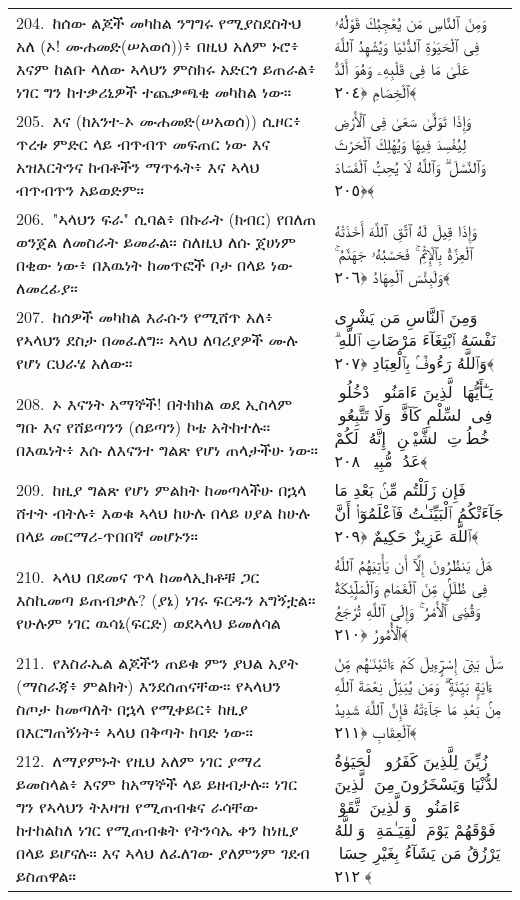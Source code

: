 \documentclass[11pt,a4paper,oneside]{article}%
\newcommand{\mytextarabic}[1]{\textarabic{ #1 \flushright}}
\begin{document}
\begin{longtable}{%
  @{}
    p{}
  @{~~~}
    p{}
    @{}
}
204.\ ከሰው ልጆች መካከል ንግግሩ የሚያስደስትህ አለ (ኦ! ሙሐመድ(ሠአወሰ))፥ በዚህ አለም ኑሮ፥ እናም ከልቡ ላለው ኣላህን ምስክሩ አድርጎ ይጠራል፥ ነገር ግን ከተቃሪኒዎች ተጨቃጫቂ መካከል ነው። &  \mytextarabic{وَمِنَ ٱلنَّاسِ مَن يُعْجِبُكَ قَوْلُهُۥ فِى ٱلْحَيَوٰةِ ٱلدُّنْيَا وَيُشْهِدُ ٱللَّهَ عَلَىٰ مَا فِى قَلْبِهِۦ وَهُوَ أَلَدُّ ٱلْخِصَامِ ﴿٢٠٤﴾}\\
205.\ እና (ከአንተ-ኦ ሙሐመድ(ሠአወሰ)) ሲዞር፥ ጥረቱ ምድር ላይ ብጥብጥ መፍጠር ነው እና አዝእርትንና ከብቶችን ማጥፋት፥ እና ኣላህ ብጥብጥን አይወድም። &  \mytextarabic{وَإِذَا تَوَلَّىٰ سَعَىٰ فِى ٱلْأَرْضِ لِيُفْسِدَ فِيهَا وَيُهْلِكَ ٱلْحَرْثَ وَٱلنَّسْلَ ۗ وَٱللَّهُ لَا يُحِبُّ ٱلْفَسَادَ ﴿٢٠٥﴾}\\
206.\ "ኣላህን ፍራ" ሲባል፥ በኩራት (ክብር) የበለጠ ወንጀል ለመስራት ይመራል። ስለዚህ ለሱ ጀሀነም በቂው ነው፥ በእዉነት ከመጥፎች ቦታ በላይ ነው ለመረፊያ።  &  \mytextarabic{وَإِذَا قِيلَ لَهُ ٱتَّقِ ٱللَّهَ أَخَذَتْهُ ٱلْعِزَّةُ بِٱلْإِثْمِ ۚ فَحَسْبُهُۥ جَهَنَّمُ ۚ وَلَبِئْسَ ٱلْمِهَادُ ﴿٢٠٦﴾}\\
207.\ ከሰዎች መካከል እራሱን የሚሸጥ አለ፥ የኣላህን ደስታ በመፈለግ። ኣላህ ለባሪያዎች ሙሉ የሆነ ርህራሄ አለው።  &  \mytextarabic{وَمِنَ ٱلنَّاسِ مَن يَشْرِى نَفْسَهُ ٱبْتِغَآءَ مَرْضَاتِ ٱللَّهِ ۗ وَٱللَّهُ رَءُوفٌۢ بِٱلْعِبَادِ ﴿٢٠٧﴾}\\
208.\ ኦ እናንት አማኞች! በትክክል ወደ ኢስላም ግቡ እና የሸይጣንን (ሰይጣን) ኮቴ አትከተሉ። በእዉነት፥ እሱ ለእናንተ ግልጽ የሆነ ጠላታችሁ ነው።  &  \mytextarabic{يَـٰٓأَيُّهَا ٱلَّذِينَ ءَامَنُوا۟ ٱدْخُلُوا۟ فِى ٱلسِّلْمِ كَآفَّةًۭ وَلَا تَتَّبِعُوا۟ خُطُوَٟتِ ٱلشَّيْطَٟنِ ۚ إِنَّهُۥ لَكُمْ عَدُوٌّۭ مُّبِينٌۭ ﴿٢٠٨﴾}\\
209.\ ከዚያ ግልጽ የሆነ ምልክት ከመጣላችሁ በኋላ ሸተት ብትሉ፥ እወቁ ኣላህ ከሁሉ በላይ ሀያል ከሁሉ በላይ መርማሪ-ጥበበኛ መሆኑን። &  \mytextarabic{ فَإِن زَلَلْتُم مِّنۢ بَعْدِ مَا جَآءَتْكُمُ ٱلْبَيِّنَـٰتُ فَٱعْلَمُوٓا۟ أَنَّ ٱللَّهَ عَزِيزٌ حَكِيمٌ ﴿٢٠٩﴾}\\
210.\ ኣላህ በደመና ጥላ ከመላኢክቶቹ ጋር እስኪመጣ ይጠብቃሉ? (ያኔ) ነገሩ ፍርዱን አግኝቷል። የሁሉም ነገር ዉሳኔ(ፍርድ) ወደኣላህ ይመለሳል &  \mytextarabic{هَلْ يَنظُرُونَ إِلَّآ أَن يَأْتِيَهُمُ ٱللَّهُ فِى ظُلَلٍۢ مِّنَ ٱلْغَمَامِ وَٱلْمَلَٟٓئِكَةُ وَقُضِىَ ٱلْأَمْرُ ۚ وَإِلَى ٱللَّهِ تُرْجَعُ ٱلْأُمُورُ ﴿٢١٠﴾}\\
211.\ የእስራኤል ልጆችን ጠይቁ ምን ያህል አያት (ማስራጃ፥ ምልክት) እንደሰጠናቸው። የኣላህን ስጦታ ከመጣለት በኋላ የሚቀይር፥ ከዚያ በእርግጠኝነት፥ ኣላህ በቅጣት ከባድ ነው።  &  \mytextarabic{سَلْ بَنِىٓ إِسْرَٟٓءِيلَ كَمْ ءَاتَيْنَـٰهُم مِّنْ ءَايَةٍۭ بَيِّنَةٍۢ ۗ وَمَن يُبَدِّلْ نِعْمَةَ ٱللَّهِ مِنۢ بَعْدِ مَا جَآءَتْهُ فَإِنَّ ٱللَّهَ شَدِيدُ ٱلْعِقَابِ ﴿٢١١﴾}\\
212.\ ለማያምኑት የዚህ አለም ነገር ያማረ ይመስላል፥ እናም ከአማኞች ላይ ይዘብታሉ። ነገር ግን የኣላህን ትእዛዝ የሚጠብቁና ራሳቸው ከተከልከለ ነገር የሚጠብቁት የትንሳኤ ቀን ከነዚያ በላይ ይሆናሉ። እና ኣላህ ለፈለገው ያለምንም ገደብ ይስጠዋል። &  \mytextarabic{زُيِّنَ لِلَّذِينَ كَفَرُوا۟ ٱلْحَيَوٰةُ ٱلدُّنْيَا وَيَسْخَرُونَ مِنَ ٱلَّذِينَ ءَامَنُوا۟ ۘ وَٱلَّذِينَ ٱتَّقَوْا۟ فَوْقَهُمْ يَوْمَ ٱلْقِيَـٰمَةِ ۗ وَٱللَّهُ يَرْزُقُ مَن يَشَآءُ بِغَيْرِ حِسَابٍۢ ﴿٢١٢﴾}\\

\end{longtable}
\end{document}
